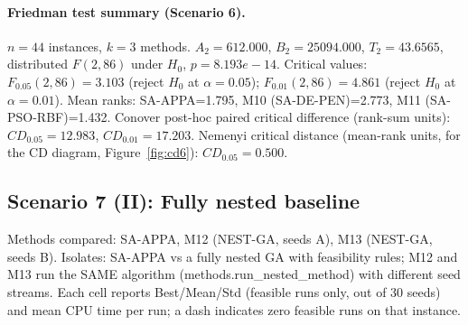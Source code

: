 \paragraph{Friedman test summary (Scenario 6).}
$n=44$ instances, $k=3$ methods. $A_2=612.000$, $B_2=25094.000$, $T_2=43.6565$, distributed $F(2,86)$ under $H_0$, $p=8.193e-14$. Critical values: $F_{0.05}(2,86)=3.103$ (reject $H_0$ at $\alpha=0.05$); $F_{0.01}(2,86)=4.861$ (reject $H_0$ at $\alpha=0.01$). Mean ranks: SA-APPA=1.795, M10 (SA-DE-PEN)=2.773, M11 (SA-PSO-RBF)=1.432. Conover post-hoc paired critical difference (rank-sum units): $CD_{0.05}=12.983$, $CD_{0.01}=17.203$. Nemenyi critical distance (mean-rank units, for the CD diagram, Figure~\ref{fig:cd6}): $CD_{0.05}=0.500$.

\subsection{Scenario 7 (II): Fully nested baseline}
\label{app:scenario7}
Methods compared: SA-APPA, M12 (NEST-GA, seeds A), M13 (NEST-GA, seeds B). Isolates: SA-APPA vs a fully nested GA with feasibility rules; M12 and M13 run the SAME algorithm (methods.run\_nested\_method) with different seed streams. Each cell reports Best/Mean/Std (feasible runs only, out of 30 seeds) and mean CPU time per run; a dash indicates zero feasible runs on that instance.

